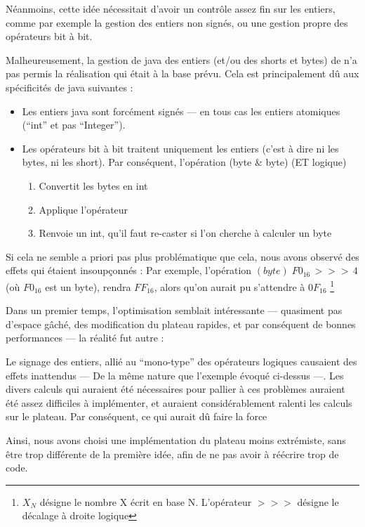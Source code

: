 \documentclass{article}
\begin{document}
Néanmoins, cette idée nécessitait d'avoir un contrôle assez fin sur les
entiers, comme par exemple la gestion des entiers non signés, ou une
gestion propre des opérateurs bit à bit.


Malheureusement, la gestion de java des entiers (et/ou des shorts et bytes) de n'a
pas permis la réalisation qui était à la base prévu. Cela est
principalement dû aux spécificités de java suivantes :
\begin{itemize}
\item Les entiers java sont forcément signés --- en tous cas les
  entiers atomiques (``int'' et pas ``Integer'').
\item Les opérateurs bit à bit traitent uniquement les entiers
  (c'est à dire ni les bytes, ni les short). Par conséquent,
  l'opération (byte \& byte) (ET logique)
  \begin{enumerate}
  \item Convertit les bytes en int 
  \item Applique l'opérateur 
  \item Renvoie un int, qu'il faut re-caster si l'on cherche à calculer un byte
  \end{enumerate}
\end{itemize}
Si cela ne semble a priori pas plus problématique que cela, 
nous avons observé des effets qui étaient
insoupçonnés : Par exemple, l'opération
\((byte)  \; F0_{16} \, >>> \,4 \)  (o\`u \(F0_{16} \) est un byte), rendra
\( FF_{16} \), alors qu'on aurait pu s'attendre à \( 0F_{16} \)
\footnote{ \(X_{N}\) désigne le
  nombre X écrit en base N. L'opérateur \(>>>\) désigne le décalage à
  droite logique}


Dans un premier temps, l'optimisation semblait intéressante ---
quasiment pas d'espace gâché, des modification du plateau rapides, et
par conséquent de bonnes performances --- la réalité fut autre :


Le signage des entiers, allié au ``mono-type'' des opérateurs logiques 
causaient des effets inattendus --- De la même nature que l'exemple
évoqué ci-dessus ---. Les divers calculs qui
auraient été nécessaires pour pallier à ces problèmes auraient été
assez difficiles à implémenter, et auraient considérablement ralenti
les calculs sur le plateau. Par conséquent, ce qui aurait dû faire la
force 


Ainsi, nous avons choisi une implémentation du plateau moins
extrémiste, sans être trop différente de la première idée, afin de ne
pas avoir à réécrire trop de code. 
 
\end{document}
